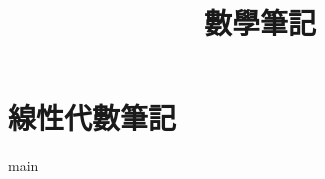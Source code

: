 \documentclass[11pt]{book}
\title{數學筆記}
\begin{document}
\maketitle
\characterPage
\tableofcontents



\chapter{線性代數筆記}
{main}
\end{document}
